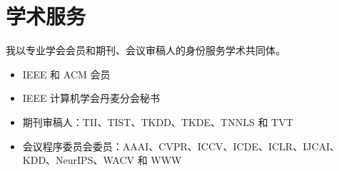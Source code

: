 \label{sec:service}
\section*{学术服务}

我以专业学会会员和期刊、会议审稿人的身份服务学术共同体。
\vspace{\entryskip}
\begin{itemize}
    \item IEEE 和 ACM 会员
    \item IEEE 计算机学会丹麦分会秘书
    \item 期刊审稿人：TII、TIST、TKDD、TKDE、TNNLS 和 TVT
    \item 会议程序委员会委员：AAAI、CVPR、ICCV、ICDE、ICLR、IJCAI、KDD、NeurIPS、WACV 和 WWW
\end{itemize}

